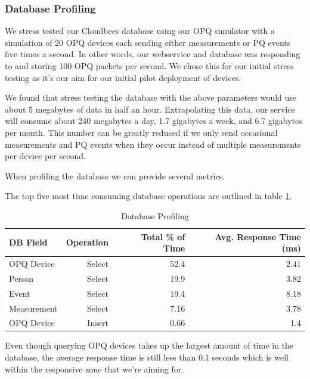 \documentclass[11pt]{article}
\begin{document}
\subsubsection{Database Profiling}
We stress tested our Cloudbees database using our OPQ simulator with a simulation of 20 OPQ devices each sending either measurements or PQ events five times a second. In other words, our webservice and database was responding to and storing 100 OPQ packets per second. We chose this for our initial stress testing as it's our aim for our initial pilot deployment of devices.

We found that stress testing the database with the above parameters would use about 5 megabytes of data in half an hour. Extrapolating this data, our service will consume about 240 megabytes a day, 1.7 gigabytes a week, and 6.7 gigabytes per month. This number can be greatly reduced if we only send occasional measurements and PQ events when they occur instead of multiple measurements per device per second.

When profiling the database we can provide several metrics. 

The top five most time consuming database operations are outlined in table \ref{tab:db_response}.

\begin{table}[htbp]
	\caption{Database Profiling}
	\label{tab:db_response}
	\begin{center}
		\begin{tabular}{|l|r|r|r|}
			\hline
			\textbf{DB Field} & \textbf{Operation} & \textbf{Total \% of Time} & \textbf{Avg. Response Time (ms)}\\
			\hline
			OPQ Device & Select & 52.4 & 2.41\\
			\hline
			Person & Select & 19.9 & 3.82\\
			\hline
			Event & Select & 19.4 & 8.18\\
			\hline
		    Measurement & Select & 7.16 & 3.78\\
			\hline
			OPQ Device & Insert & 0.66 & 1.4\\
			\hline
		\end{tabular}
	\end{center}
\end{table} 

Even though querying OPQ devices takes up the largest amount of time in the database, the average response time is still less than 0.1 seconds which is well within the responsive zone that we're aiming for.
\end{document}
